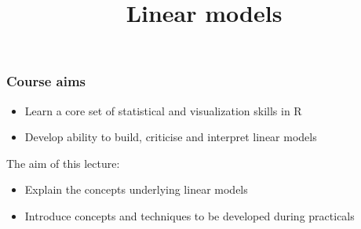 \documentclass[aspectratio=43]{beamer}
\title{Linear models}
\date{}
\begin{document}


\frame{\titlepage}

\frame
{
  \frametitle{Course aims}

  \begin{itemize}
  \item Learn a core set of statistical and visualization skills in R  
  \item Develop ability to build, criticise and interpret linear models
  \end{itemize}
  \vspace{12pt}
  The aim of this lecture:
  \begin{itemize}
  \item Explain the concepts underlying linear models
  \item Introduce concepts and techniques to be developed during practicals
  \end{itemize}
}


\end{document}
